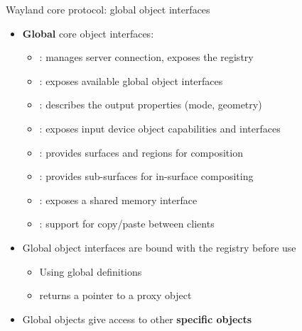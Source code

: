 \begin{frame}{Wayland core protocol: global object interfaces}
  \begin{itemize}
  \item \textbf{Global} core object interfaces:
    \begin{itemize}
    \item {}: manages server connection, exposes the registry
    \item {}: exposes available global object interfaces
    \item {}: describes the output properties (mode, geometry)
    \item {}: exposes input device object capabilities and interfaces
    \item {}: provides surfaces and regions for composition
    \item {}: provides sub-surfaces for in-surface compositing
    \item {}: exposes a shared memory interface
    \item {}: support for copy/paste between clients
    \end{itemize}
  \item Global object interfaces are bound with the registry before use
    \begin{itemize}
    \item Using global  definitions
    \item {} returns a pointer to a proxy object
    \end{itemize}
  \item Global objects give access to other \textbf{specific objects}
  \end{itemize}
\end{frame}

